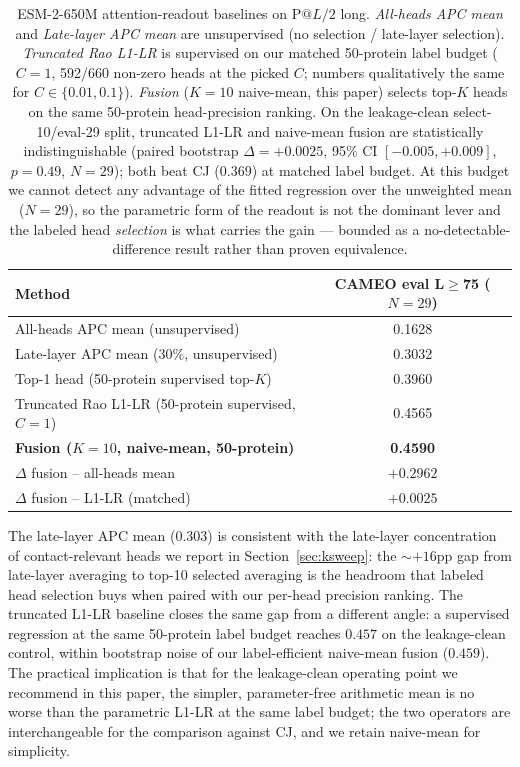 \documentclass{article}
\begin{document}
\begin{table}[h]
\centering
\small
\caption{ESM-2-650M attention-readout baselines on $\text{P}@L/2$
long. \emph{All-heads APC mean} and \emph{Late-layer APC mean} are
unsupervised (no selection / late-layer selection). \emph{Truncated
Rao L1-LR} is supervised on our matched 50-protein label budget
($C{=}1$, 592/660 non-zero heads at the picked $C$; numbers
qualitatively the same for $C \in \{0.01, 0.1\}$). \emph{Fusion}
($K{=}10$ naive-mean, this paper) selects top-$K$ heads on the same
50-protein head-precision ranking. On the leakage-clean
select-10/eval-29 split, truncated L1-LR and naive-mean fusion are
statistically indistinguishable (paired bootstrap $\Delta {=} +0.0025$,
95\% CI $[-0.005, +0.009]$, $p{=}0.49$, $N{=}29$); both beat CJ
($0.369$) at matched label budget. At this budget we cannot detect any
advantage of the fitted regression over the unweighted mean ($N{=}29$),
so the parametric form of the readout is not the dominant lever and the
labeled head \emph{selection} is what carries the gain --- bounded as a
no-detectable-difference result rather than proven equivalence.}
\label{tab:rao}
\begin{tabular}{lc}
\toprule
Method & CAMEO eval L$\geq$75 ($N{=}29$) \\
\midrule
All-heads APC mean (unsupervised)              & 0.1628 \\
Late-layer APC mean ($30\%$, unsupervised)     & 0.3032 \\
Top-1 head (50-protein supervised top-$K$)     & 0.3960 \\
Truncated Rao L1-LR (50-protein supervised, $C{=}1$) & 0.4565 \\
\textbf{Fusion ($K{=}10$, naive-mean, 50-protein)}  & \textbf{0.4590} \\
\midrule
$\Delta$ fusion -- all-heads mean    & $+0.2962$ \\
$\Delta$ fusion -- L1-LR (matched)   & $+0.0025$ \\
\bottomrule
\end{tabular}
\end{table}

The late-layer APC mean ($0.303$) is consistent with the late-layer
concentration of contact-relevant heads we report in
Section~\ref{sec:ksweep}: the $\sim$$+16$pp gap from late-layer
averaging to top-10 selected averaging is the headroom that labeled
head selection buys when paired with our per-head precision ranking.
The truncated L1-LR baseline closes the same gap from a different
angle: a supervised regression at the same 50-protein label budget
reaches $0.457$ on the leakage-clean control, within bootstrap noise
of our label-efficient naive-mean fusion ($0.459$). The
practical implication is that for the leakage-clean operating point
we recommend in this paper, the simpler, parameter-free arithmetic
mean is no worse than the parametric L1-LR at the same label budget;
the two operators are interchangeable for the comparison against
CJ, and we retain naive-mean for simplicity.
\end{document}

